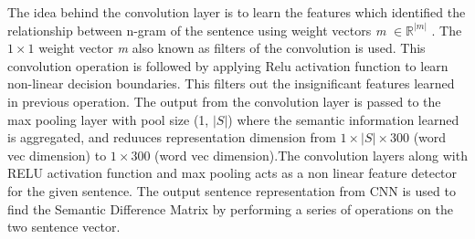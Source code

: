 \documentclass[12pt]{report} %
\begin{document}
	The idea behind the convolution layer is to learn the features which identified the relationship between n-gram of the sentence using weight vectors \textit{m} $\in \mathbb{R}^{|m|}$ . The $1 \times 1$ weight vector \textit{m} also known as filters of the convolution is used. This convolution operation is followed by applying Relu activation function to learn non-linear decision boundaries. This filters out the insignificant features learned in previous operation. The output from the convolution layer is passed to the max pooling layer with pool size (1, $|S|$) where the semantic information learned is aggregated, and reduuces representation dimension from $1 \times |S| \times 300$ (word vec dimension) to $1 \times 300$ (word vec dimension).The convolution layers along with RELU activation function and max pooling acts as a non linear  feature detector for the given sentence. The output sentence representation from CNN is used to find the Semantic Difference Matrix by performing a series of operations on the two sentence vector. 
	
\end{document}
